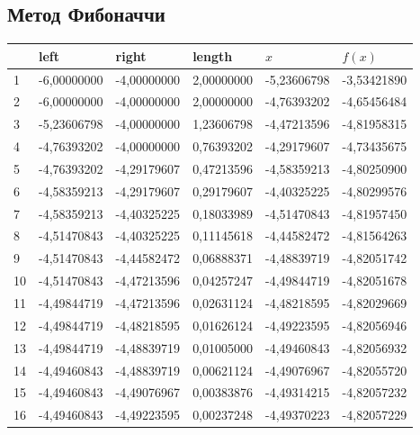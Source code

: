 \subsection{Метод Фибоначчи}\label{subsec:метод-фибоначчи}
\begin{center}
    \begin{tabular}{ | l | l | l | l | l | l |}
        \hline
        \textnumero{} & left        & right       & length     & $x$         & $f(x)$      \\ \hline
        1             & -6,00000000 & -4,00000000 & 2,00000000 & -5,23606798 & -3,53421890 \\
        2             & -6,00000000 & -4,00000000 & 2,00000000 & -4,76393202 & -4,65456484 \\
        3             & -5,23606798 & -4,00000000 & 1,23606798 & -4,47213596 & -4,81958315 \\
        4             & -4,76393202 & -4,00000000 & 0,76393202 & -4,29179607 & -4,73435675 \\
        5             & -4,76393202 & -4,29179607 & 0,47213596 & -4,58359213 & -4,80250900 \\
        6             & -4,58359213 & -4,29179607 & 0,29179607 & -4,40325225 & -4,80299576 \\
        7             & -4,58359213 & -4,40325225 & 0,18033989 & -4,51470843 & -4,81957450 \\
        8             & -4,51470843 & -4,40325225 & 0,11145618 & -4,44582472 & -4,81564263 \\
        9             & -4,51470843 & -4,44582472 & 0,06888371 & -4,48839719 & -4,82051742 \\
        10            & -4,51470843 & -4,47213596 & 0,04257247 & -4,49844719 & -4,82051678 \\
        11            & -4,49844719 & -4,47213596 & 0,02631124 & -4,48218595 & -4,82029669 \\
        12            & -4,49844719 & -4,48218595 & 0,01626124 & -4,49223595 & -4,82056946 \\
        13            & -4,49844719 & -4,48839719 & 0,01005000 & -4,49460843 & -4,82056932 \\
        14            & -4,49460843 & -4,48839719 & 0,00621124 & -4,49076967 & -4,82055720 \\
        15            & -4,49460843 & -4,49076967 & 0,00383876 & -4,49314215 & -4,82057232 \\
        16            & -4,49460843 & -4,49223595 & 0,00237248 & -4,49370223 & -4,82057229 \\

\end{tabular}
\end{center}
